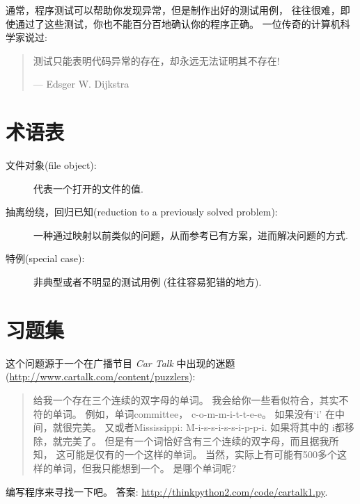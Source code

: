 \documentclass[10pt]{book}
\begin{document}
通常，程序测试可以帮助你发现异常，但是制作出好的测试用例，
往往很难，即使通过了这些测试，你也不能百分百地确认你的程序正确。
一位传奇的计算机科学家说过:

\begin{quote}

测试只能表明代码异常的存在，却永远无法证明其不存在!

--- Edsger W. Dijkstra
\end{quote}


\section{术语表}

\begin{description}

\item[文件对象(file object):] 代表一个打开的文件的值.

\item[抽离纷绕，回归已知(reduction to a previously solved problem):] 一种通过映射以前类似的问题，从而参考已有方案，进而解决问题的方式.

\item[特例(special case):] 非典型或者不明显的测试用例
(往往容易犯错的地方).

\end{description}


\section{习题集}

\begin{exercise}

这个问题源于一个在广播节目 {\em Car Talk} 中出现的迷题
(\url{http://www.cartalk.com/content/puzzlers}):

\begin{quote}
给我一个存在三个连续的双字母的单词。
我会给你一些看似符合，其实不符的单词。
例如，单词committee， c-o-m-m-i-t-t-e-e。 如果没有`i' 在中间，就很完美。
又或者Mississippi: M-i-s-s-i-s-s-i-p-p-i.
如果将其中的 i都移除，就完美了。
但是有一个词恰好含有三个连续的双字母，而且据我所知，
这可能是仅有的一个这样的单词。
当然，实际上有可能有500多个这样的单词，但我只能想到一个。
是哪个单词呢?
\end{quote}

编写程序来寻找一下吧。
答案: \url{http://thinkpython2.com/code/cartalk1.py}.

\end{exercise}
\end{document}
